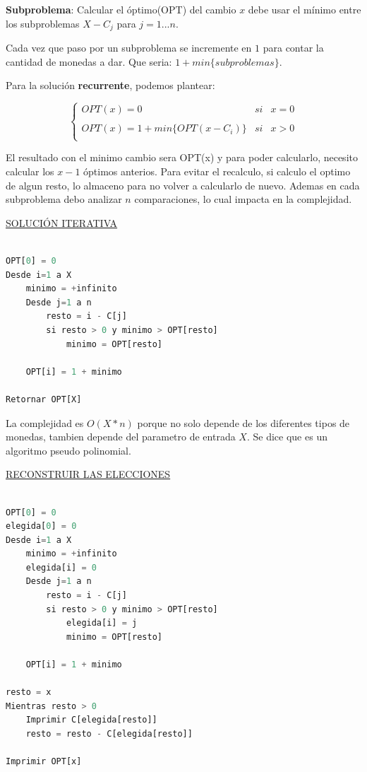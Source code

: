 \documentclass{article}
\begin{document}
\newpage
\textbf{Subproblema}: Calcular el óptimo(OPT) del cambio \(x\) debe usar el mínimo entre los subproblemas \(X - C_j\) para \(j=1...n\).

Cada vez que paso por un subproblema se incremente en \(1\) para contar la cantidad de monedas a dar. 
Que seria: \(1+min\{subproblemas\}\).

Para la solución \textbf{recurrente}, podemos plantear:

    \[
        \left\{ \begin{array}{lcc}
            OPT(x) = 0 &   si  & x = 0 \\
            \\ OPT(x) = 1+min\{OPT(x-C_i)\} &  si & x > 0 \\
            \end{array}
        \right.
    \]

El resultado con el minimo cambio sera OPT(x) y para poder calcularlo, 
necesito calcular los \(x-1\) óptimos anterios. 
Para evitar el recalculo, si calculo el optimo de algun resto, 
lo almaceno para no volver a calcularlo de nuevo.
Ademas en cada subproblema debo analizar \(n\) comparaciones, lo cual impacta en la complejidad.

\newpage
\noindent
\underline{SOLUCIÓN ITERATIVA}
\begin{lstlisting}[language=Python, caption=Solución iterativa]

OPT[0] = 0
Desde i=1 a X
    minimo = +infinito
    Desde j=1 a n
        resto = i - C[j]
        si resto > 0 y minimo > OPT[resto]
            minimo = OPT[resto]
    
    OPT[i] = 1 + minimo

Retornar OPT[X]
\end{lstlisting}

La complejidad es \(O(X*n)\) porque no solo depende de los diferentes tipos de monedas, tambien
depende del parametro de entrada \(X\). Se dice que es un algoritmo pseudo polinomial.

\noindent
\underline{RECONSTRUIR LAS ELECCIONES}

\begin{lstlisting}[language=Python, caption=Solución iterativa con reconstrucción]

OPT[0] = 0
elegida[0] = 0
Desde i=1 a X
    minimo = +infinito
    elegida[i] = 0
    Desde j=1 a n
        resto = i - C[j]
        si resto > 0 y minimo > OPT[resto]
            elegida[i] = j
            minimo = OPT[resto]
    
    OPT[i] = 1 + minimo

resto = x
Mientras resto > 0
    Imprimir C[elegida[resto]]
    resto = resto - C[elegida[resto]]

Imprimir OPT[x]

\end{lstlisting}
\end{document}
